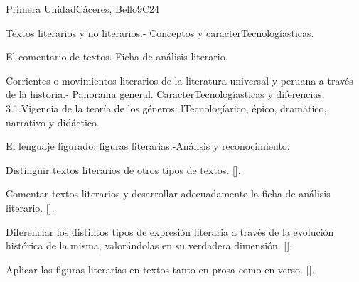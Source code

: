 \begin{syllabus}
\begin{outcomes}
    \item {}
    \item {}
\end{outcomes}
\begin{competences}
    \item {}
\end{competences}

\begin{unit}{}{Primera Unidad}{Cáceres, Bello}{9}{C24}
\begin{topics}
	\item Textos literarios y no literarios.- Conceptos y caracterTecnologíasticas.
	\item El comentario de textos. Ficha de análisis literario.
	\item Corrientes o movimientos literarios de la literatura universal y peruana a través de la historia.- Panorama general. CaracterTecnologíasticas y diferencias.
	3.1.Vigencia de la teoría de los géneros: lTecnologíarico, épico, dramático, narrativo y didáctico.
	\item El lenguaje figurado: figuras literarias.-Análisis y reconocimiento.
\end{topics}
\begin{learningoutcomes}
	\item Distinguir textos literarios de otros tipos de textos. [\Usage].
	\item Comentar textos literarios y desarrollar adecuadamente la ficha de análisis literario. [\Usage].
	\item Diferenciar los distintos tipos de expresión literaria a través de la evolución histórica de la misma, valorándolas en su verdadera dimensión. [\Usage].
	\item Aplicar las figuras literarias en textos tanto en prosa como en verso. [\Usage].
\end{learningoutcomes}
\end{unit}


\end{syllabus}
